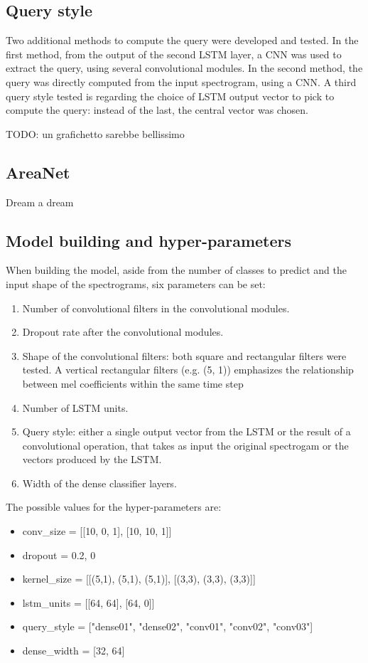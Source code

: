 \subsection{Query style}

Two additional methods to compute the query were developed and tested.
In the first method, from the output of the second LSTM layer, a CNN was used
to extract the query, using several convolutional modules.
In the second method, the query was directly computed from the input
spectrogram, using a CNN.
A third query style tested is regarding the choice of LSTM output vector to
pick to compute the query: instead of the last, the central vector was chosen.

TODO: un grafichetto sarebbe bellissimo

\subsection{AreaNet}

Dream a dream

\subsection{Model building and hyper-parameters}

When building the model, aside from the number of classes to predict and the
input shape of the spectrograms, six parameters can be set:
\begin{enumerate}
    \item Number of convolutional filters in the convolutional modules.
    \item Dropout rate after the convolutional modules.
    \item Shape of the convolutional filters:
        both square and rectangular filters were tested.
        A vertical rectangular filters (e.g. (5, 1)) emphasizes the
        relationship between mel coefficients within the same time step
    \item Number of LSTM units.
    \item Query style: either a single output vector from the LSTM or the
        result of a convolutional operation, that takes as input the original
        spectrogam or the vectors produced by the LSTM.
    \item Width of the dense classifier layers.
\end{enumerate}
The possible values for the hyper-parameters are:
\begin{itemize}
    \item conv\_size = [[10, 0, 1], [10, 10, 1]]
    \item dropout = {0.2, 0}
    \item kernel\_size = [[(5,1), (5,1), (5,1)], [(3,3), (3,3), (3,3)]]
    \item lstm\_units = [[64, 64], [64, 0]]
    \item query\_style = ["dense01", "dense02", "conv01", "conv02", "conv03"]
    \item dense\_width = [32, 64]
\end{itemize}

